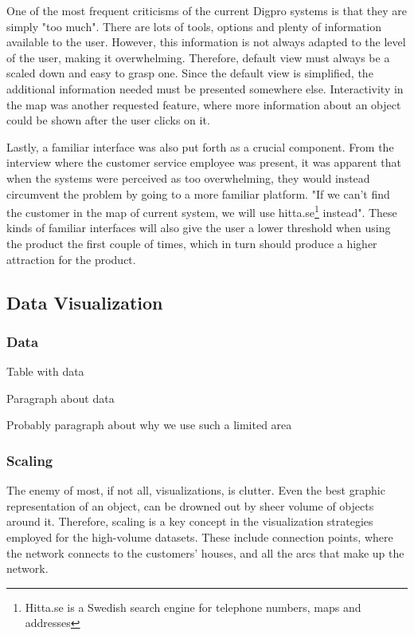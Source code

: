 \documentclass[a4paper,12pt,titlepage]{article}
\begin{document}
One of the most frequent criticisms of the current Digpro systems is that they are simply "too much". There are lots of tools, options and plenty of information available to the user. However, this information is not always adapted to the level of the user, making it overwhelming. Therefore, default view must always be a scaled down and easy to grasp one. Since the default view is simplified, the additional information needed must be presented somewhere else. Interactivity in the map was another requested feature, where more information about an object could be shown after the user clicks on it.

Lastly, a familiar interface was also put forth as a crucial component. From the interview where the customer service employee was present, it was apparent that when the systems were perceived as too overwhelming, they would instead circumvent the problem by going to a more familiar platform. "If we can't find the customer in the map of current system, we will use hitta.se\footnote{Hitta.se is a Swedish search engine for telephone numbers, maps and addresses} instead". These kinds of familiar interfaces will also give the user a lower threshold when using the product the first couple of times, which in turn should produce a higher attraction for the product.

\subsection{Data Visualization}
\subsubsection{Data}

Table with data

Paragraph about data

Probably paragraph about why we use such a limited area

\subsubsection{Scaling}
The enemy of most, if not all, visualizations, is clutter. Even the best graphic representation of an object, can be drowned out by sheer volume of objects around it. Therefore, scaling is a key concept in the visualization strategies employed for the high-volume datasets. These include connection points, where the network connects to the customers' houses, and all the arcs that make up the network.
\end{document}
